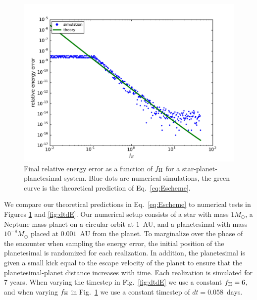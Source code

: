 \begin{figure}
\centerline{\includegraphics[scale=0.45]{chap4/images/HSR_v_dE.pdf}}
\caption{Final relative energy error as a function of $f_{\rm H}$ for a star-planet-planetesimal system. 
Blue dots are numerical simulations, the green curve is the theoretical prediction of Eq.~\ref{eq:Escheme}.
 }
\label{fig:HSFdE}
\end{figure}
We compare our theoretical predictions in Eq.~\ref{eq:Escheme} to numerical tests in Figures \ref{fig:HSFdE} and \ref{fig:dtdE}.
Our numerical setup consists of a star with mass $1M_\odot$, a Neptune mass planet on a circular orbit at $1$~AU, and a planetesimal with mass $10^{-8}M_\odot$ placed at $0.001$~AU from the planet.
To marginalize over the phase of the encounter when sampling the energy error, the initial position of the planetesimal is randomized for each realization.
In addition, the planetesimal is given a small kick equal to the escape velocity of the planet to ensure that the planetesimal-planet distance increases with time.
Each realization is simulated for 7 years.
When varying the timestep in Fig.~\ref{fig:dtdE} we use a constant $f_{\rm H} = 6$, and when varying $f_{\rm H}$ in Fig.~\ref{fig:HSFdE} we use a constant timestep of $dt = 0.058$~days.

